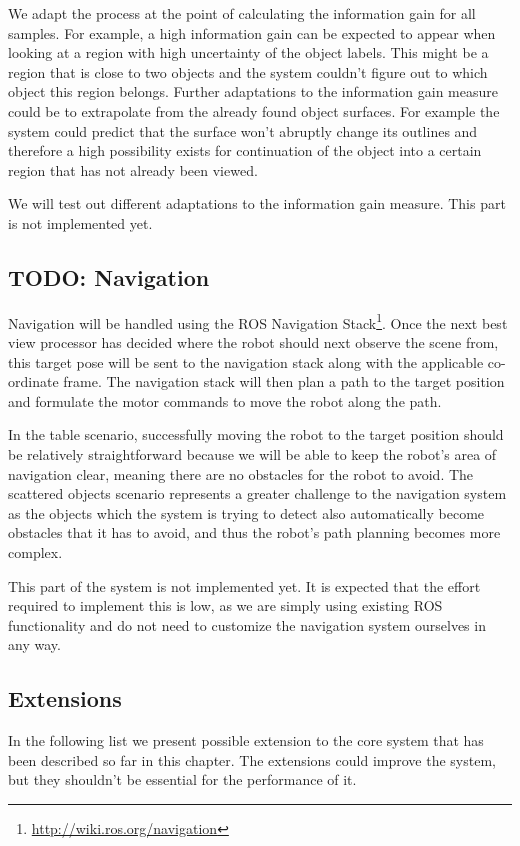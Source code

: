 \documentclass[a4paper,11pt,english]{article}
\begin{document}
We adapt the process at the point of calculating the information gain for all samples.
For example, a high information gain can be expected to appear when looking at a region with high uncertainty of the object labels.
This might be a region that is close to two objects and the system couldn't figure out to which object this region belongs.
Further adaptations to the information gain measure could be to extrapolate from the already found object surfaces. 
For example the system could predict that the surface won't abruptly change its outlines and therefore a high possibility exists for continuation of the object into a certain region that has not already been viewed.

We will test out different adaptations to the information gain measure. This part is not implemented yet.

\subsection{TODO: Navigation}
\label{system:navigation}
Navigation will be handled using the ROS Navigation Stack\footnote{\url{http://wiki.ros.org/navigation}}.
Once the next best view processor has decided where the robot should next observe the scene from, this target pose will be sent to the navigation stack along with the applicable co-ordinate frame.
The navigation stack will then plan a path to the target position and formulate the motor commands to move the robot along the path.

In the table scenario, successfully moving the robot to the target position should be relatively straightforward because we will be able to keep the robot's area of navigation clear, meaning there are no obstacles for the robot to avoid.
The scattered objects scenario represents a greater challenge to the navigation system as the objects which the system is trying to detect also automatically become obstacles that it has to avoid, and thus the robot's path planning becomes more complex.

This part of the system is not implemented yet. It is expected that the effort required to implement this is low, as we are simply using existing ROS functionality and do not need to customize the navigation system ourselves in any way.

\subsection{Extensions}
\label{system:extensions}
In the following list we present possible extension to the core system that has been described so far in this chapter. 
The extensions could improve the system, but they shouldn't be essential for the performance of it.
\end{document}
